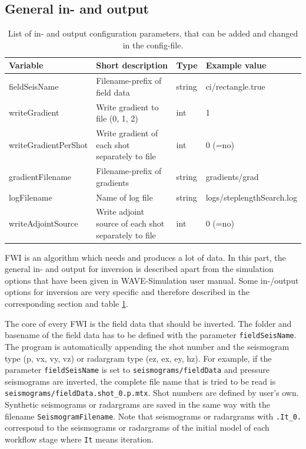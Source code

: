 \documentclass[pdftex,a4paper,parskip,listof=totoc,bibliography=totoc,onehalfspacing,12pt]{scrreprt}
\begin{document}
\subsection{General in- and output}
\begin{table}[h!]
\caption[List of in- and output configuration parameters.]{List of in- and output configuration parameters, that can be added and changed in the config-file.}\label{tab:config_IO}
\centering
\begin{adjustbox}{width=1\textwidth,center=\textwidth}
	\begin{tabular}{llll}
	\toprule
         Variable                 & Short description                                                   & Type   & Example value \\
	\midrule
         fieldSeisName            & Filename-prefix of field data                                                  & string & ci/rectangle.true  \\    
         writeGradient            & Write gradient to file (0, 1, 2)                                             &  int   & 1 \\
         writeGradientPerShot     & Write gradient of each shot separately to file                      &  int   & 0 (=no) \\
         gradientFilename         & Filename-prefix of gradients                                                   & string & gradients/grad \\     
         logFilename              & Name of log file                                                    & string & logs/steplengthSearch.log  \\
         writeAdjointSource & Write adjoint source of each shot separately to file                      &  int   & 0 (=no) \\
	\bottomrule
	\end{tabular}
	\end{adjustbox}
\end{table}
FWI is an algorithm which needs and produces a lot of data. In this part, the general in- and output for inversion is described apart from the simulation options that have been given in WAVE-Simulation user manual. Some in-/output options for inversion are very specific and therefore described in the corresponding section and table \ref{tab:config_IO}.

The core of every FWI is the field data that should be inverted. The folder and basename of the field data has to be defined with the parameter \verb+fieldSeisName+. The program is automatically appending the shot number and the seismogram type (p, vx, vy, vz) or radargram type (ez, ex, ey, hz). For example, if the parameter \verb+fieldSeisName+ is set to \verb+seismograms/fieldData+ and pressure seismograms are inverted, the complete file name that is tried to be read is \verb+seismograms/fieldData.shot_0.p.mtx+. Shot numbers are defined by user's own. Synthetic seismograms or radargrams are saved in the same way with the filename \verb+SeismogramFilename+. Note that seismograms or radargrams with \verb+.It_0.+ correspond to the seismograms or radargrams of the initial model of each workflow stage where \verb+It+ means iteration.
\end{document}
